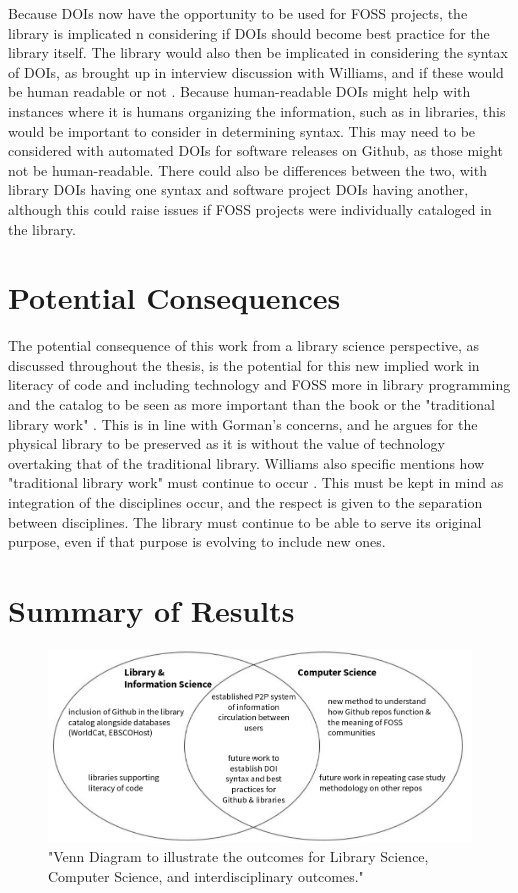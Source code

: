 Because DOIs now have the opportunity to be used for FOSS projects, the library is implicated n considering if DOIs should become best practice for the library itself. The library would also then be implicated in considering the syntax of DOIs, as brought up in interview discussion with Williams, and if these would be human readable or not \cite{patrickinterview}. Because human-readable DOIs might help with instances where it is humans organizing the information, such as in libraries, this would be important to consider in determining syntax. This may need to be considered with automated DOIs for software releases on Github, as those might not be human-readable. There could also be differences between the two, with library DOIs having one syntax and software project DOIs having another, although this could raise issues if FOSS projects were individually cataloged in the library. 

\section{Potential Consequences}

The potential consequence of this work from a library science perspective, as discussed throughout the thesis, is the potential for this new implied work in literacy of code and including technology and FOSS more in library programming and the catalog to be seen as more important than the book or the "traditional library work" \cite{patrickinterview}. This is in line with Gorman's concerns, and he argues for the physical library to be preserved as it is without the value of technology overtaking that of the traditional library. Williams also specific mentions how "traditional library work" must continue to occur \cite{patrickinterview}. This must be kept in mind as integration of the disciplines occur, and the respect is given to the separation between disciplines. The library must continue to be able to serve its original purpose, even if that purpose is evolving to include new ones. 

\section{Summary of Results}

\begin{figure}[hbt!]
\begin{center}
\includegraphics[width=.8\textwidth]{./images/results_venn.png}
\caption{"Venn Diagram to illustrate the outcomes for Library Science, Computer Science, and interdisciplinary outcomes."}
\vspace{0in}
\end{center}
\end{figure}

